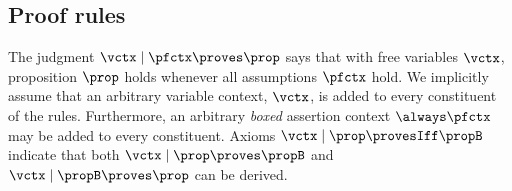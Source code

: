 
\subsection{Proof rules}

The judgment $\vctx \mid \pfctx \proves \prop$ says that with free variables $\vctx$, proposition $\prop$ holds whenever all assumptions $\pfctx$ hold.
We implicitly assume that an arbitrary variable context, $\vctx$, is added to every constituent of the rules.
Furthermore, an arbitrary \emph{boxed} assertion context $\always\pfctx$ may be added to every constituent.
Axioms $\vctx \mid \prop \provesIff \propB$ indicate that both $\vctx \mid \prop \proves \propB$ and $\vctx \mid \propB \proves \prop$ can be derived.

\judgment{}{\vctx \mid \pfctx \proves \prop}

